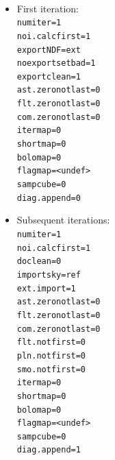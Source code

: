 \documentclass[twoside,11pt]{article}
\renewcommand{\_}{\texttt{\symbol{95}}}
\newcommand{\sstitemlist}[1]{
  \mbox{} \\
  \vspace{-3.5ex}
  \begin{itemize}
     #1
  \end{itemize}
}
\newcommand{\sstitem}{\item}
\newcommand{\sstitemlist}[1]{
      \begin{itemize}
         #1
      \end{itemize}
      \\
   }
\newcommand{\sstitem}{\item}
\begin{document}
{{{         \sstitemlist{
            \sstitem
            First iteration:
            {\tt \\
               numiter=1 \\
               noi.calcfirst=1 \\
               exportNDF=ext \\
               noexportsetbad=1 \\
               exportclean=1 \\
               ast.zero\_notlast=0 \\
               flt.zero\_notlast=0 \\
               com.zero\_notlast=0 \\
               itermap=0 \\
               shortmap=0 \\
               bolomap=0 \\
               flagmap=<undef> \\
               sampcube=0 \\
               diag.append=0
            }

            \sstitem
            Subsequent iterations:
            {\tt \\
               numiter=1 \\
               noi.calcfirst=1 \\
               doclean=0 \\
               importsky=ref \\
               ext.import=1 \\
               ast.zero\_notlast=0 \\
               flt.zero\_notlast=0 \\
               com.zero\_notlast=0 \\
               flt.notfirst=0 \\
               pln.notfirst=0 \\
               smo.notfirst=0 \\
               itermap=0 \\
               shortmap=0 \\
               bolomap=0 \\
               flagmap=<undef> \\
               sampcube=0 \\
               diag.append=1
            }

}}}}
\end{document}
